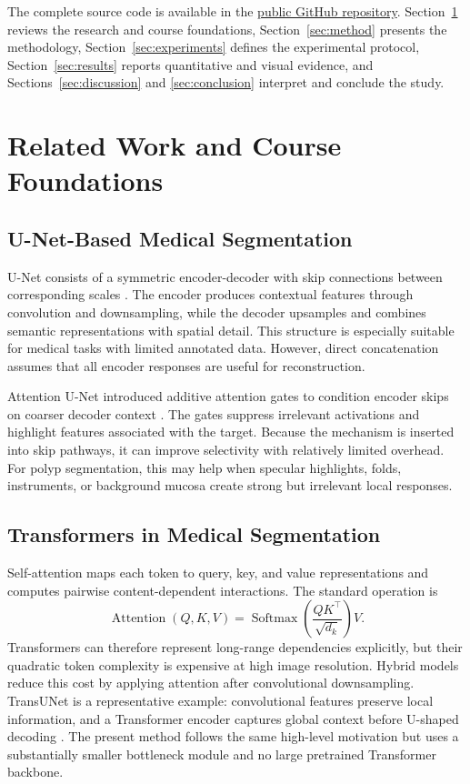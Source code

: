\documentclass[a4paper,10pt]{article}
\begin{document}
The complete source code is available in the \href{https://github.com/hammiroussama/lightweight-transformer-unet-kvasir}{public GitHub repository}. Section~\ref{sec:related} reviews the research and course foundations, Section~\ref{sec:method} presents the methodology, Section~\ref{sec:experiments} defines the experimental protocol, Section~\ref{sec:results} reports quantitative and visual evidence, and Sections~\ref{sec:discussion} and \ref{sec:conclusion} interpret and conclude the study.

\section{Related Work and Course Foundations}
\label{sec:related}

\subsection{U-Net-Based Medical Segmentation}

U-Net consists of a symmetric encoder-decoder with skip connections between corresponding scales \cite{ronneberger2015unet}. The encoder produces contextual features through convolution and downsampling, while the decoder upsamples and combines semantic representations with spatial detail. This structure is especially suitable for medical tasks with limited annotated data. However, direct concatenation assumes that all encoder responses are useful for reconstruction.

Attention U-Net introduced additive attention gates to condition encoder skips on coarser decoder context \cite{oktay2018attention}. The gates suppress irrelevant activations and highlight features associated with the target. Because the mechanism is inserted into skip pathways, it can improve selectivity with relatively limited overhead. For polyp segmentation, this may help when specular highlights, folds, instruments, or background mucosa create strong but irrelevant local responses.

\subsection{Transformers in Medical Segmentation}

Self-attention maps each token to query, key, and value representations and computes pairwise content-dependent interactions. The standard operation is
\begin{equation}
\operatorname{Attention}(Q,K,V)=\operatorname{Softmax}\left(\frac{QK^{\top}}{\sqrt{d_k}}\right)V.
\end{equation}
Transformers can therefore represent long-range dependencies explicitly, but their quadratic token complexity is expensive at high image resolution. Hybrid models reduce this cost by applying attention after convolutional downsampling. TransUNet is a representative example: convolutional features preserve local information, and a Transformer encoder captures global context before U-shaped decoding \cite{chen2024transunet}. The present method follows the same high-level motivation but uses a substantially smaller bottleneck module and no large pretrained Transformer backbone.
\end{document}

